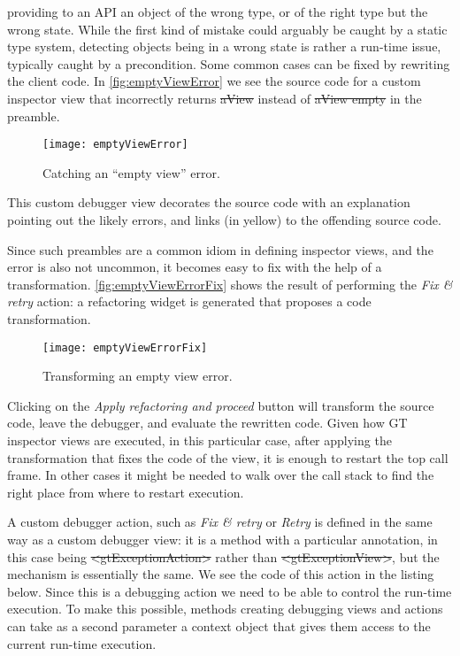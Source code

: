 \documentclass[sigplan,10pt]{acmart}
\newcommand\on[1]{\nbc{ON}{#1}{olive}} %
\newcommand\ac[1]{\nbc{AC}{#1}{teal}}
\newcommand{\GT}{\lst{GT}\xspace} %
\begin{document}
providing to an API an object of the wrong type, or of the right type but the wrong state.
While the first kind of mistake could arguably be caught by a static type system, detecting objects being in a wrong state is rather a run-time issue, typically caught by a precondition.
Some common cases can be fixed by rewriting the client code.
In \autoref{fig:emptyViewError} we see the source code for a custom inspector view that incorrectly returns \st{aView} instead of \st{aView empty} in the preamble.
\begin{figure}[h]
  \texttt{[image: emptyViewError]}
  \caption{Catching an ``empty view'' error.}
  \label{fig:emptyViewError}
\end{figure}
This custom debugger view decorates the source code with an explanation pointing out the likely errors, and links (in yellow) to the offending source code.


Since such preambles are a common idiom in defining \GT inspector views, and the error is also not uncommon, it becomes easy to fix with the help of a transformation.
\autoref{fig:emptyViewErrorFix} shows the result of performing the \emph{Fix \& retry} action: a refactoring widget is generated that proposes a code transformation.
\begin{figure*}[h]
  \texttt{[image: emptyViewErrorFix]}
  \caption{Transforming an empty view error.}
  \label{fig:emptyViewErrorFix}
\end{figure*}
Clicking on the \emph{Apply refactoring and proceed} button will transform the source code, leave the debugger, and evaluate the rewritten code.
Given how GT inspector views are executed, in this particular case, after applying the transformation that fixes the code of the view, it is enough to restart the top call frame.
In other cases it might be needed to walk over the call stack to find the right place from where to restart execution.

A custom debugger action, such as \emph{Fix \& retry} or \emph{Retry} is defined in the same way as a custom debugger view: it is a method with a particular annotation, in this case being \mbox{\st{<gtExceptionAction>}} rather than \mbox{\st{<gtExceptionView>}}, but  the mechanism is essentially the same. We see the code of this action in the listing below.
Since this is a debugging action we need to be able to control the run-time execution.
To make this possible, methods creating debugging views and actions can take as a second parameter a context object that gives them access to the current run-time execution.
\end{document}
